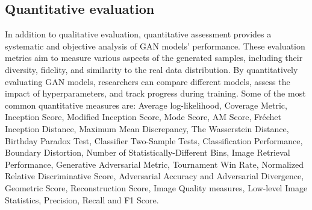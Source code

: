 \subsection{Quantitative evaluation}
\label{subsec:quantitative-evaluation}
In addition to qualitative evaluation, quantitative assessment provides a systematic and objective analysis of GAN models' performance. 
These evaluation metrics aim to measure various aspects of the generated samples, including their diversity, fidelity, and similarity to the real data distribution. 
By quantitatively evaluating GAN models, researchers can compare different models, assess the impact of hyperparameters, and track progress during training.
Some of the most common quantitative measures are: Average log-likelihood, Coverage Metric, Inception Score, Modified Inception Score, Mode Score, AM Score, Fréchet Inception Distance, 
Maximum Mean Discrepancy, The Wasserstein Distance, Birthday Paradox Test, Classifier Two-Sample Tests, Classification Performance, Boundary Distortion, 
Number of Statistically-Different Bins, Image Retrieval Performance, Generative Adversarial Metric, Tournament Win Rate, Normalized Relative Discriminative Score, Adversarial Accuracy and Adversarial Divergence, 
Geometric Score, Reconstruction Score, Image Quality measures, Low-level Image Statistics, Precision, Recall and F1 Score.
